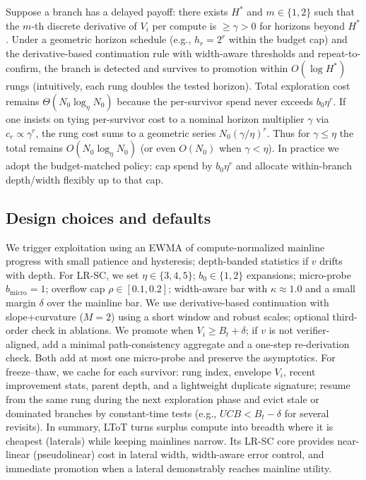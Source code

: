 \documentclass{article}
\begin{document}
Suppose a branch has a delayed payoff: there exists $H^{*}$ and $m\!\in\!\{1,2\}$ such that the $m$-th discrete derivative of $V_i$ per compute is $\ge \gamma>0$ for horizons beyond $H^{*}$. Under a geometric horizon schedule (e.g., $h_r=2^r$ within the budget cap) and the derivative-based continuation rule with width-aware thresholds and repeat-to-confirm, the branch is detected and survives to promotion within $O(\log H^{*})$ rungs (intuitively, each rung doubles the tested horizon). Total exploration cost remains $\Theta(N_0 \log_\eta N_0)$ because the per-survivor spend never exceeds $b_0\eta^r$. If one insists on tying per-survivor cost to a nominal horizon multiplier $\gamma$ via $c_r\propto \gamma^r$, the rung cost sums to a geometric series $N_0(\gamma/\eta)^r$. Thus for $\gamma\le\eta$ the total remains $O(N_0\log_\eta N_0)$ (or even $O(N_0)$ when $\gamma<\eta$). In practice we adopt the budget-matched policy: cap spend by $b_0\eta^r$ and allocate within-branch depth/width flexibly up to that cap.

\vspace{0.5em}

\subsection{Design choices and defaults}
\label{sec:defaults}

We trigger exploitation using an EWMA of compute-normalized mainline progress with small patience and hysteresis; depth-banded statistics if $v$ drifts with depth. For LR-SC, we set $\eta\in\{3,4,5\}$; $b_0\in\{1,2\}$ expansions; micro-probe $b_{\text{micro}}=1$; overflow cap $\rho\in[0.1,0.2]$; width-aware bar with $\kappa\!\approx\!1.0$ and a small margin $\delta$ over the mainline bar. We use derivative-based continuation with slope+curvature ($M{=}2$) using a short window and robust scales; optional third-order check in ablations. We promote when $V_i \ge B_t + \delta$; if $v$ is not verifier-aligned, add a minimal path-consistency aggregate and a one-step re-derivation check. Both add at most one micro-probe and preserve the asymptotics. For freeze--thaw, we cache for each survivor: rung index, envelope $V_i$, recent improvement stats, parent depth, and a lightweight duplicate signature; resume from the same rung during the next exploration phase and evict stale or dominated branches by constant-time tests (e.g., $UCB<B_t-\delta$ for several revisits). In summary, LToT turns surplus compute into breadth where it is cheapest (laterals) while keeping mainlines narrow. Its LR-SC core provides near-linear (pseudolinear) cost in lateral width, width-aware error control, and immediate promotion when a lateral demonstrably reaches mainline utility.
\end{document}

